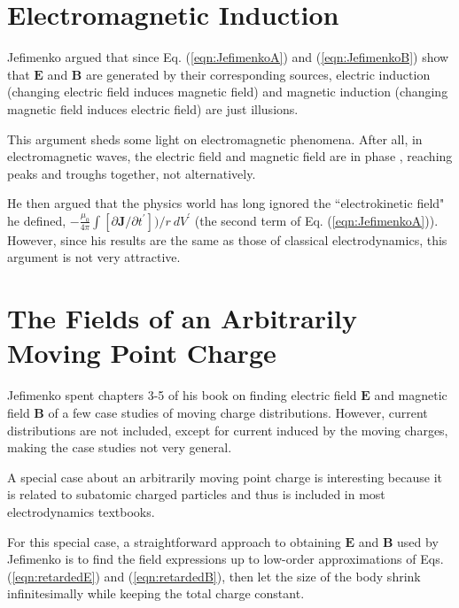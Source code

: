 \documentclass[11pt]{article}              %
\begin{document}
\section[Electromagnetic Induction]{Electromagnetic Induction
   }
Jefimenko argued that since Eq. (\ref{eqn:JefimenkoA}) and (\ref{eqn:JefimenkoB}) show that ${\mathbf E}$ and ${\mathbf B}$ are generated by their corresponding sources, electric induction (changing electric field induces magnetic field) and magnetic induction (changing magnetic field induces electric field) are just illusions.

This argument sheds some light on electromagnetic phenomena. After all, in electromagnetic waves, the electric field and magnetic field are in phase \cite{griffiths1999introduction}, reaching peaks and troughs together, not alternatively.

He then argued that the physics world has long ignored the ``electrokinetic field" he defined, $-\frac{\mu_0}{4\pi}\int [\partial {\mathbf J}/\partial t^\prime])/r\ dV^\prime$ (the second term of Eq. (\ref{eqn:JefimenkoA})). However, since his results are the same as those of classical electrodynamics, this argument is not very attractive.

\section{The Fields of an Arbitrarily Moving Point Charge}


Jefimenko spent chapters 3-5 of his book on finding electric field ${\mathbf E}$ and magnetic field ${\mathbf B}$ of a few case studies of moving charge distributions. However, current distributions are not included, except for current induced by the moving charges, making the case studies not very general. 

A special case about an arbitrarily moving point charge is interesting because it is related to subatomic charged particles and thus is included in most electrodynamics textbooks.

For this special case, a straightforward approach to obtaining $\mathbf{E}$ and $\mathbf{B}$ used by Jefimenko is to find the field expressions up to low-order approximations of Eqs. (\ref{eqn:retardedE}) and (\ref{eqn:retardedB}), then let the size of the body shrink infinitesimally while keeping the total charge constant. 
\end{document}
